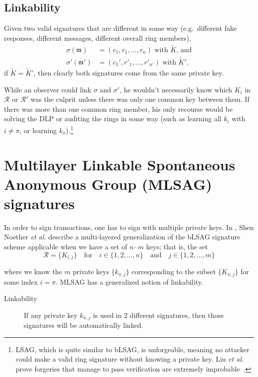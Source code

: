 \subsection*{Linkability}

Given two valid signatures that are different in some way (e.g.\ different fake responses, different messages, different overall ring members),\vspace{.07cm}
\begin{align*}
	\sigma(\mathfrak{m})   &= (c_1, r_1, ..., r_n)\textrm{ with } \tilde{K}\textrm{, and}\\
	\sigma'(\mathfrak{m}')  &= (c_1', r'_1, ..., r'_{n'})\textrm{ with } \tilde{K}'\textrm{,}
\end{align*}
\quad if \(\tilde{K} =  \tilde{K}'\), then clearly both signatures come from the same private key.%

While an observer could link $\sigma$ and $\sigma'$, he wouldn't necessarily know which $K_i$ in $\mathcal{R}$ or $\mathcal{R}'$ was the culprit unless there was only one common key between them. If there was more than one common ring member, his only recourse would be solving the DLP or auditing the rings in some way (such as learning all $k_i$ with $i \neq \pi$, or learning $k_\pi$).\footnote{\label{lsag_unforgeable_note}LSAG, which is quite similar to bLSAG, is unforgeable, meaning no attacker could make a valid ring signature without knowing a private key. Liu {\em et al.} prove forgeries that manage to pass verification are extremely improbable~\cite{Liu2004}.}



\section{Multilayer Linkable Spontaneous Anonymous Group (MLSAG) signatures}
\label{sec:MLSAG}

In order to sign transactions, one has to sign with multiple private keys. In \cite{MRL-0005-ringct}, Shen Noether {\em et al.} describe a multi-layered generalization of the bLSAG signature scheme applicable when we have a set of \(n \cdot m\) keys; that is, the set\vspace{.175cm}
\[\mathcal{R} = \{K_{i,j}\}  \quad \textrm{for} \quad  i \in \{1, 2, ..., n\} \quad \textrm{and} \quad j \in \{1, 2, ..., m\}\]

where we know the $m$ private keys \(\{k_{\pi, j}\}\) corresponding to the subset \(\{K_{\pi, j}\}\) for some index \(i = \pi\). MLSAG has a generalized notion of linkability.
\begin{description}
	\item[Linkability] If any private key \(k_{\pi, j}\) is used in 2 different signatures, then those signatures will be automatically linked.
\end{description}


